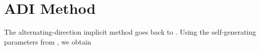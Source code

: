 \chapter{ADI Method}

The alternating-direction implicit method goes back to \cite{Peaceman1955}.
Using the self-generating parameters from \cite{Kuerschner2016}, we obtain

